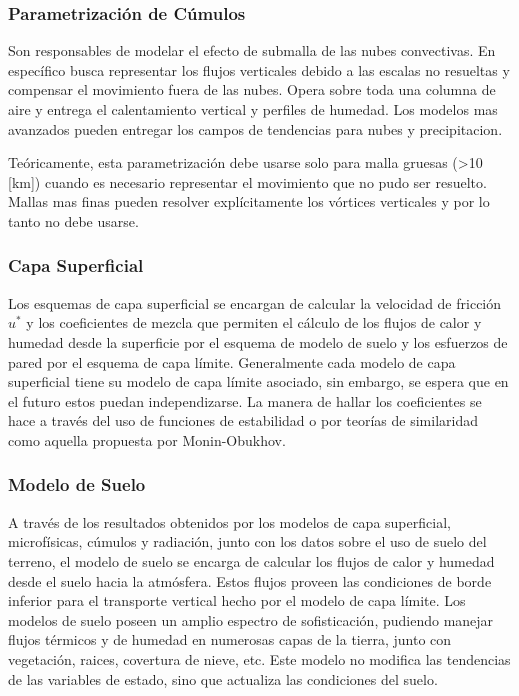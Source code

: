 \subsubsection{Parametrización de Cúmulos}
Son responsables de modelar el efecto de submalla de las nubes convectivas. En específico busca representar los flujos verticales debido a las escalas no resueltas y compensar el movimiento fuera de las nubes. Opera sobre toda una columna de aire y entrega el calentamiento vertical y perfiles de humedad. Los modelos mas avanzados pueden entregar los campos de tendencias para nubes y precipitacion.

Teóricamente, esta parametrización debe usarse solo para malla gruesas (>10 [km]) cuando es necesario representar el movimiento que no pudo ser resuelto. Mallas mas finas pueden resolver explícitamente los vórtices verticales y por lo tanto no debe usarse.
\subsubsection{Capa Superficial}
Los esquemas de capa superficial se encargan de calcular la velocidad de fricción $u^*$ y los coeficientes de mezcla que permiten el cálculo de los flujos de calor y humedad desde la superficie por el esquema de modelo de suelo y los esfuerzos de pared por el esquema de capa límite. Generalmente cada modelo de capa superficial tiene su modelo de capa límite asociado, sin embargo, se espera que en el futuro estos puedan independizarse. La manera de hallar los coeficientes se hace a través del uso de funciones de estabilidad o por teorías de similaridad como aquella propuesta por Monin-Obukhov.
\subsubsection{Modelo de Suelo}
A través de los resultados obtenidos por los modelos de capa superficial, microfísicas, cúmulos y radiación, junto con los datos sobre el uso de suelo del terreno, el modelo de suelo se encarga de calcular los flujos de calor y humedad desde el suelo hacia la atmósfera. Estos flujos proveen las condiciones de borde inferior para el transporte vertical hecho por el modelo de capa límite. Los modelos de suelo poseen un amplio espectro de sofisticación, pudiendo manejar flujos térmicos y de humedad en numerosas capas de la tierra, junto con vegetación, raices, covertura de nieve, etc. Este modelo no modifica las tendencias de las variables de estado, sino que actualiza las condiciones del suelo.
